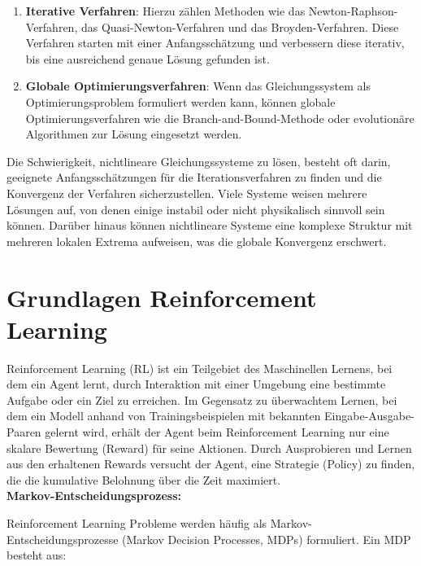 \documentclass{article}
\theoremstyle{newline}
\begin{document}
\begin{onehalfspace}
\begin{enumerate}
	\item \textbf{Iterative Verfahren}: Hierzu zählen Methoden wie das Newton-Raphson-Verfahren, das Quasi-Newton-Verfahren und das Broyden-Verfahren. Diese Verfahren starten mit einer Anfangsschätzung und verbessern diese iterativ, bis eine ausreichend genaue Lösung gefunden ist.
	
	\item \textbf{Globale Optimierungsverfahren}: Wenn das Gleichungssystem als Optimierungsproblem formuliert werden kann, können globale Optimierungsverfahren wie die Branch-and-Bound-Methode oder evolutionäre Algorithmen zur Lösung eingesetzt werden.
\end{enumerate}

Die Schwierigkeit, nichtlineare Gleichungssysteme zu lösen, besteht oft darin, geeignete Anfangsschätzungen für die Iterationsverfahren zu finden und die Konvergenz der Verfahren sicherzustellen. Viele Systeme weisen mehrere Lösungen auf, von denen einige instabil oder nicht physikalisch sinnvoll sein können. Darüber hinaus können nichtlineare Systeme eine komplexe Struktur mit mehreren lokalen Extrema aufweisen, was die globale Konvergenz erschwert. 


\section{Grundlagen Reinforcement Learning}

Reinforcement Learning (RL) ist ein Teilgebiet des Maschinellen Lernens, bei dem ein Agent lernt, durch Interaktion mit einer Umgebung eine bestimmte Aufgabe oder ein Ziel zu erreichen. Im Gegensatz zu überwachtem Lernen, bei dem ein Modell anhand von Trainingsbeispielen mit bekannten Eingabe-Ausgabe-Paaren gelernt wird, erhält der Agent beim Reinforcement Learning nur eine skalare Bewertung (Reward) für seine Aktionen. Durch Ausprobieren und Lernen aus den erhaltenen Rewards versucht der Agent, eine Strategie (Policy) zu finden, die die kumulative Belohnung über die Zeit maximiert.
\\

\textbf{Markov-Entscheidungsprozess:}
\smallskip

Reinforcement Learning Probleme werden häufig als Markov-Entscheidungsprozesse (Markov Decision Processes, MDPs) formuliert. Ein MDP besteht aus:


\end{onehalfspace}
\end{document}

